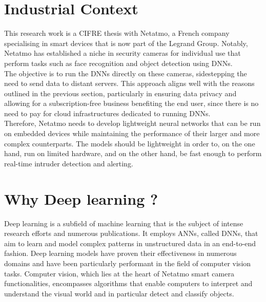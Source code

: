 \section{Industrial Context}


This research work is a CIFRE thesis with Netatmo, a French company specialising
in smart devices that is now part of the Legrand Group. Notably, Netatmo has
established a niche in security cameras for individual use that perform tasks
such as face recognition and object detection using \acp{DNN}.\\

The objective is to run the \acp{DNN} directly on these cameras, sidestepping the
need to send data to distant servers. This approach aligns well with the reasons
outlined in the previous section, particularly in ensuring data privacy and
allowing for a subscription-free business benefiting the end user, since there
is no need to pay for cloud infrastructures dedicated to running \acp{DNN}.\\

Therefore, Netatmo needs to develop lightweight neural networks that can be run
on embedded devices while maintaining the performance of their larger and more
complex counterparts. The models should be lightweight in order to, on the one
hand, run on limited hardware, and on the other hand, be fast enough to perform
real-time intruder detection and alerting.\\

\section{Why Deep learning ?}

Deep learning is a subfield of machine learning that is the subject of intense
research efforts and numerous publications. It employs \aclp{ANN}, called
\acfp{DNN}, that aim to learn and model complex patterns in unstructured data in
an end-to-end fashion. Deep learning models have proven their effectiveness in
numerous domains and have been particularly performant in the field of computer
vision tasks. Computer vision, which lies at the heart of Netatmo smart camera
functionalities, encompasses algorithms that enable computers to interpret and
understand the visual world and in particular detect and classify objects.\\

